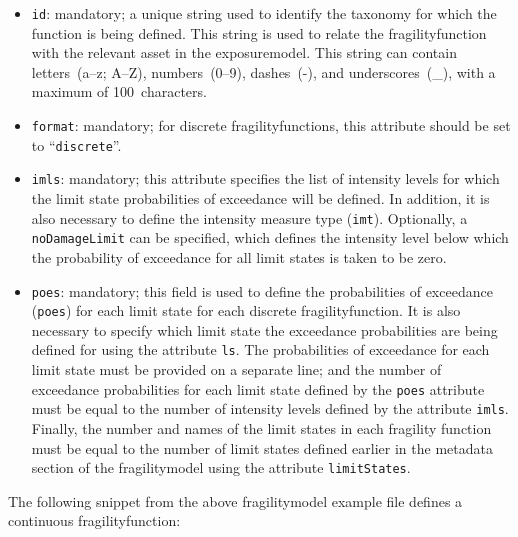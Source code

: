 \begin{itemize}

    \item \Verb+id+: mandatory; a unique string used to identify the 
      \gls{taxonomy} for which the function is being defined. This string is
      used to relate the \gls{fragilityfunction} with the relevant \gls{asset}
      in the \gls{exposuremodel}. This string can contain letters~(a--z; A--Z),
      numbers~(0--9), dashes~(-), and underscores~(\_), with a maximum of
      100~characters.

    \item \Verb+format+: mandatory; for discrete \glspl{fragilityfunction}, this
      attribute should be set to ``\Verb+discrete+''.

    \item \Verb+imls+: mandatory; this attribute specifies the list of intensity levels
      for which the limit state probabilities of exceedance will be defined. 
      In addition, it is also necessary to define the intensity measure type 
      (\Verb+imt+). Optionally, a \Verb+noDamageLimit+ can be specified, which 
      defines the intensity level below which the probability of exceedance 
      for all limit states is taken to be zero.

    \item \Verb+poes+: mandatory; this field is used to define the probabilities of 
      exceedance (\Verb+poes+) for each limit state for each discrete 
      \gls{fragilityfunction}. It is also necessary to specify which limit 
      state the exceedance probabilities are being defined for using the 
      attribute \Verb+ls+. The probabilities of exceedance for each limit state
      must be provided on a separate line; and the number of exceedance 
      probabilities for each limit state defined by the \Verb+poes+ attribute 
      must be equal to the number of intensity levels defined by the attribute 
      \Verb+imls+. Finally, the number and names of the limit states in each 
      fragility function must be equal to the number of limit states defined 
      earlier in the metadata section of the \gls{fragilitymodel} using the 
      attribute \Verb+limitStates+.

\end{itemize}



The following snippet from the above \gls{fragilitymodel} example file
defines a continuous \gls{fragilityfunction}:

\inputminted[firstline=19,firstnumber=19,lastline=25,fontsize=\footnotesize,frame=single,linenos,bgcolor=lightgray]{xml}{oqum/risk/verbatim/input_fragility.xml}

